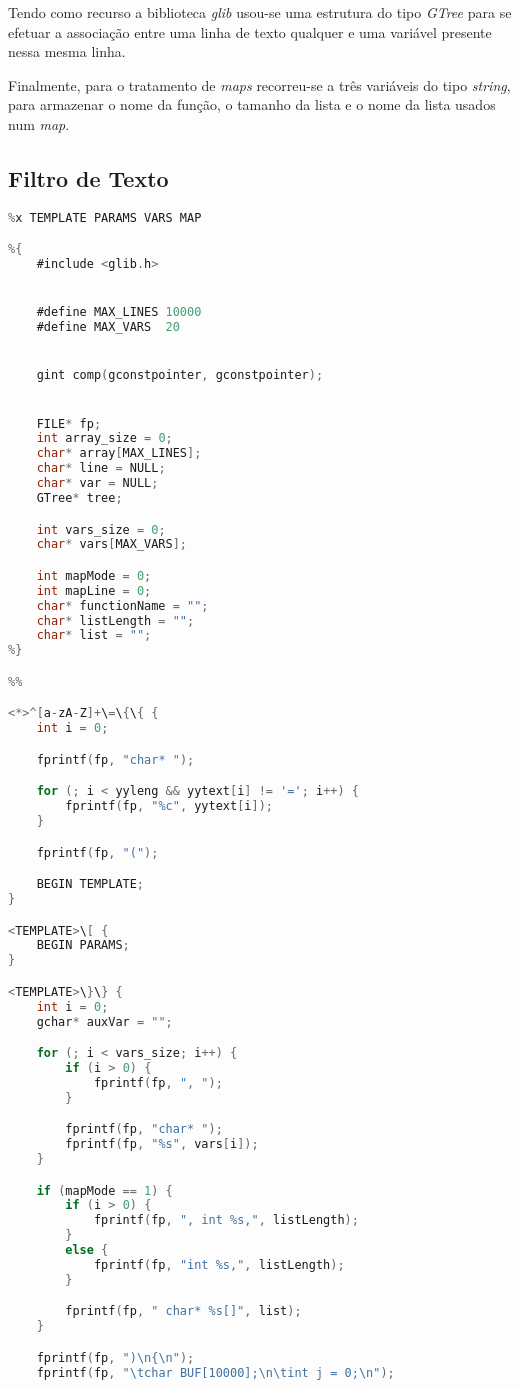 \documentclass{article}
\begin{document}
Tendo como recurso a biblioteca \emph{glib} usou-se uma estrutura do tipo \emph{GTree} para se efetuar a associação entre uma linha de texto qualquer e uma variável presente nessa mesma linha.

Finalmente, para o tratamento de \emph{maps} recorreu-se a três variáveis do tipo \emph{string}, para armazenar o nome da função, o tamanho da lista e o nome da lista usados num \emph{map}.


\subsection{Filtro de Texto}

\begin{lstlisting}[language=C]
%option noyywrap
%x TEMPLATE PARAMS VARS MAP

%{
	#include <glib.h>


	#define MAX_LINES 10000
	#define MAX_VARS  20


	gint comp(gconstpointer, gconstpointer);


	FILE* fp;	
	int array_size = 0;
	char* array[MAX_LINES];
	char* line = NULL;
	char* var = NULL;
	GTree* tree;

	int vars_size = 0;
	char* vars[MAX_VARS];

	int mapMode = 0;
	int mapLine = 0; 
	char* functionName = "";
	char* listLength = ""; 
	char* list = "";
%}

%%

<*>^[a-zA-Z]+\=\{\{ {
	int i = 0;

	fprintf(fp, "char* ");

	for (; i < yyleng && yytext[i] != '='; i++) {
		fprintf(fp, "%c", yytext[i]);
	}

	fprintf(fp, "(");

	BEGIN TEMPLATE;
}

<TEMPLATE>\[ {
	BEGIN PARAMS;
}

<TEMPLATE>\}\} {
	int i = 0;
	gchar* auxVar = "";

	for (; i < vars_size; i++) {
		if (i > 0) {
			fprintf(fp, ", ");
		}

		fprintf(fp, "char* ");
		fprintf(fp, "%s", vars[i]);	
	}

	if (mapMode == 1) {
		if (i > 0) {
			fprintf(fp, ", int %s,", listLength);
		}
		else {
			fprintf(fp, "int %s,", listLength);
		}

		fprintf(fp, " char* %s[]", list);		
	}

	fprintf(fp, ")\n{\n");
	fprintf(fp, "\tchar BUF[10000];\n\tint j = 0;\n");
	

\end{lstlisting}
\end{document}
